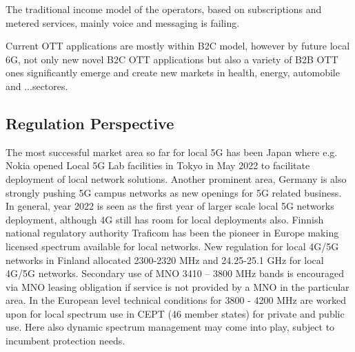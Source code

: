 \documentclass[journal,twocolumn]{IEEEtran}
\begin{document}
The traditional income model of
the operators, based on subscriptions and metered services, mainly voice and
messaging is failing.

Current OTT applications are mostly within B2C model, however by future local 6G, not only new novel B2C OTT applications but also a variety of B2B OTT ones significantly emerge and create new markets in health, energy, automobile and ...sectores. 

\subsection{Regulation Perspective}



The most successful market area so far for local 5G has been Japan where e.g. Nokia opened Local 5G Lab facilities in Tokyo in May 2022 to facilitate deployment of local network solutions. Another prominent area, Germany is also strongly pushing 5G campus networks as new openings for 5G related business. In general, year 2022 is seen as the first year of larger scale local 5G networks deployment, although 4G still has room for local deployments also. Finnish national regulatory authority Traficom has been the pioneer in Europe making licensed spectrum available for local networks. New regulation for local 4G/5G networks in Finland allocated 2300-2320 MHz and 24.25-25.1 GHz for local 4G/5G networks. Secondary use of MNO 3410 – 3800 MHz bands is encouraged via MNO leasing obligation if service is not provided by a MNO in the particular area. In the European level technical conditions for 3800 - 4200 MHz are worked upon for local spectrum use in CEPT (46 member states) for private and public use. Here also dynamic spectrum management may come into play, subject to incumbent protection needs.
\end{document}
